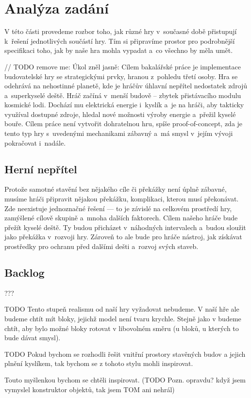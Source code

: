 
\chapter{Analýza zadání}

V této části provedeme rozbor toho, jak různé hry v~současné době přistupují k~řešení jednotlivých součástí hry. Tím si připravíme prostor pro podrobnější specifikaci toho, jak by naše hra mohla vypadat a~co všechno by měla umět.

// TODO remove me:
Úkol zněl jasně: Cílem bakalářské práce je implementace budovatelské hry se strategickými prvky, hranou z~pohledu třetí osoby. Hra se odehrává na nehostinné planetě, kde je hráčův úhlavní nepřítel nedostatek zdrojů a~superkyselé deště. Hráč začíná v~menší budově – zbytek přistávacího modulu kosmické lodi. Dochází mu elektrická energie i~kyslík a~je na hráči, aby takticky využíval dostupné zdroje, hledal nové možnosti výroby energie a~přežil kyselé bouře. Cílem práce není vytvořit dohratelnou hru, spíše proof-of-concept, zda je tento typ hry s~uvedenými mechanikami zábavný a~má smysl v~jejím vývoji pokračovat i~nadále.








\section{Herní nepřítel}
Protože samotné stavění bez nějakého cíle či překážky není úplně zábavné, musíme hráči připravit nějakou překážku, komplikaci, kterou musí překonávat. Zde neexistuje jednoznačné řešení --- to je závislé na celkovém prostředí hry, zamýšlené cílově skupině a~mnoha dalších faktorech. Cílem našeho hráče bude přežít kyselé deště. Ty budou přicházet v~náhodných intervalech a~budou sloužit jako překážka v~rozvoji hry. Zároveň to ale bude pro hráče nástroj, jak získávat prostředky pro ochranu před dalšími dešti a~rozvoj svých staveb. 

\section{Backlog}


???




TODO Tento stupeň realismu od naší hry vyžadovat nebudeme. V naší hře ale budeme chtít mít bloky, jejichž model není tvaru krychle. Stejně jako v \SE{} budeme chtít, aby bylo možné bloky rotovat v libovolném směru (u bloků, u kterých to bude dávat smysl).

TODO Pokud bychom se rozhodli řešit vnitřní prostory stavěných budov a jejich plnění kyslíkem, tak bychom se z tohoto stylu mohli inspirovat.

Touto myšlenkou bychom se chtěli inspirovat.  (TODO Pozn. opravdu? když jsem vymyslel konstruktor objektů, tak jsem TOM ani nehrál)